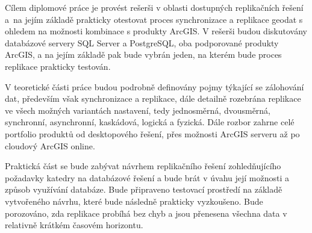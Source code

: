 Cílem diplomové práce je provést rešerši v oblasti dostupných replikačních řešení a~na jejím základě prakticky otestovat proces synchronizace a replikace geodat s ohledem na možnosti kombinace s produkty ArcGIS. V rešerši budou diskutovány databázové servery SQL Server a PostgreSQL, oba podporované produkty ArcGIS, a na jejím základě pak bude vybrán jeden, na kterém bude proces replikace prakticky testován.

V teoretické části práce budou podrobně definovány pojmy týkající se zálohování dat, především však synchronizace a replikace, dále detailně rozebrána replikace ve všech možných variantách nastavení, tedy jednosměrná, dvousměrná, synchronní, asynchronní, kaskádová, logická a fyzická. Dále rozbor zahrne celé portfolio produktů od desktopového řešení, přes možnosti ArcGIS serveru až po cloudový ArcGIS online.

Praktická část se bude zabývat návrhem replikačního řešení zohledňujícího požadavky katedry na databázové řešení a bude brát v úvahu její možnosti a způsob využívání databáze. Bude připraveno testovací prostředí na základě vytvořeného návrhu, které bude následně prakticky vyzkoušeno. Bude porozováno, zda replikace probíhá bez chyb a jsou přenesena všechna data v relativně krátkém časovém horizontu. 


